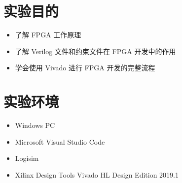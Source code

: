 \documentclass[UTF8,fontset=fandol]{ctexart}
\begin{document}
\section*{实验目的}
\begin{itemize}
    \item 了解 FPGA 工作原理
    \item 了解 Verilog 文件和约束文件在 FPGA 开发中的作用
    \item 学会使用 Vivado 进行 FPGA 开发的完整流程
\end{itemize}
\section*{实验环境}
\begin{itemize}
    \item Windows PC
    \item Microsoft Visual Studio Code
    \item Logisim
    \item Xilinx Design Tools Vivado HL Design Edition 2019.1 
\end{itemize}
\end{document}

